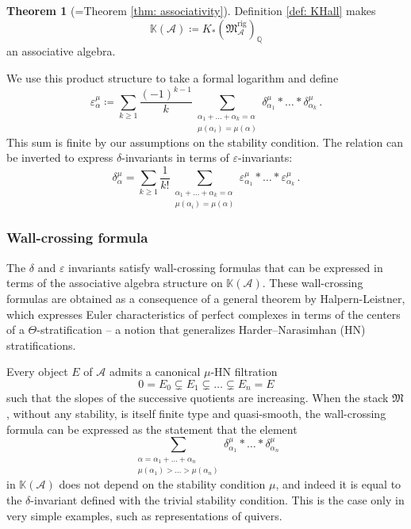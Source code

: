 \documentclass[12pt]{amsart}
\theoremstyle{definition}
\newtheorem{thm}{Theorem}
\newcommand{\BK}{{\mathbb{K}}}
\newcommand{\BQ}{{\mathbb{Q}}}
\newcommand{\CA}{{\mathcal A}}
\newcommand{\1}{\mathbf 1}
\newcommand{\FM}{{\mathfrak{M}}}
\newcommand{\rig}{\mathrm{rig}}
\begin{document}
\begin{thm}[{=Theorem \ref{thm: associativity}}]
Definition \ref{def: KHall} makes
\[\BK(\CA)\coloneqq K_\ast(\FM^\rig_\CA)_\BQ\]
an associative algebra.
\end{thm}

We use this product structure to take a formal logarithm and define
\begin{equation*}
      \label{eq: epsilonfromdeltaintro}\varepsilon_\alpha^\mu\coloneqq \sum_{k\geq 1}\frac{(-1)^{k-1}}{k}\sum_{\substack{\alpha_1+\ldots+\alpha_k=\alpha\\\mu(\alpha_i)=\mu(\alpha)}}\delta^\mu_{\alpha_1}\ast\ldots \ast\delta^\mu_{\alpha_{k}}\,.
      \end{equation*}
This sum is finite by our assumptions on the stability condition. The relation can be inverted to express $\delta$-invariants in terms of $\varepsilon$-invariants:
\begin{equation*}
  \delta_\alpha^\mu=\sum_{k\geq 1}\frac{1}{k!}\sum_{\substack{\alpha_1+\ldots+\alpha_k=\alpha\\\mu(\alpha_i)=\mu(\alpha)}}\varepsilon^\mu_{\alpha_1}\ast\ldots \ast\varepsilon^\mu_{\alpha_{k}}\,.\end{equation*}




\subsubsection{Wall-crossing formula}
\label{subsubsec: wcintro}

The $\delta$ and $\varepsilon$ invariants satisfy wall-crossing formulas that can be expressed in terms of the associative algebra structure on $\BK(\CA)$. These wall-crossing formulas are obtained as a consequence of a general theorem by Halpern-Leistner, which expresses Euler characteristics of perfect complexes in terms of the centers of a $\Theta$-stratification -- a notion that generalizes Harder--Narasimhan (HN) stratifications.

Every object $E$ of $\CA$ admits a canonical $\mu$-HN filtration 
\[0=E_0\subsetneq E_1 \subsetneq \ldots \subsetneq E_n=E\]
such that the slopes of the successive quotients are increasing. When the stack $\FM$, without any stability, is itself finite type and quasi-smooth, the wall-crossing formula can be expressed as the statement that the element
\[\sum_{\substack{\alpha=\alpha_1+\ldots+\alpha_n\\\mu(\alpha_1)>\ldots>\mu(\alpha_n)}}\delta_{\alpha_1}^\mu\ast\ldots\ast \delta_{\alpha_n}^\mu\]
in $\BK(\CA)$ does not depend on the stability condition $\mu$, and indeed it is equal to the $\delta$-invariant defined with the trivial stability condition. This is the case only in very simple examples, such as representations of quivers.
\end{document}
